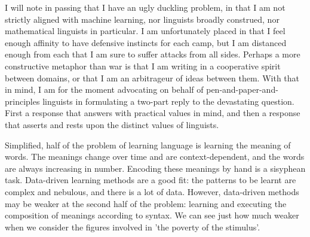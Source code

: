 I will note in passing that I have an ugly duckling problem, in that I am not strictly aligned with machine learning, nor linguists broadly construed, nor mathematical linguists in particular. I am unfortunately placed in that I feel enough affinity to have defensive instincts for each camp, but I am distanced enough from each that I am sure to suffer attacks from all sides. Perhaps a more constructive metaphor than war is that I am writing in a cooperative spirit between domains, or that I am an arbitrageur of ideas between them. With that in mind, I am for the moment advocating on behalf of pen-and-paper-and-principles linguists in formulating a two-part reply to the devastating question. First a response that answers with practical values in mind, and then a response that asserts and rests upon the distinct values of linguists.


Simplified, half of the problem of learning language is learning the meaning of words. The meanings change over time and are  context-dependent, and the words are always increasing in number. Encoding these meanings by hand is a sisyphean task. Data-driven learning methods are a good fit: the patterns to be learnt are complex and nebulous, and there is a lot of data. However, data-driven methods may be weaker at the second half of the problem: learning and executing the composition of meanings according to syntax. We can see just how much weaker when we consider the figures involved in 'the poverty of the stimulus'.\\

